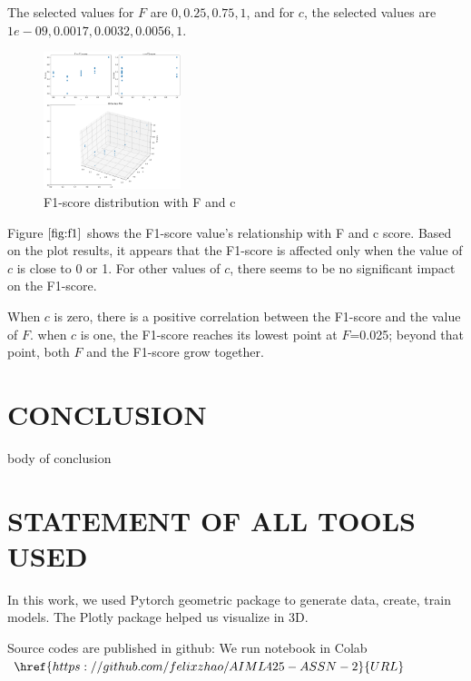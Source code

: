 \documentclass{article}
\begin{document}
  The selected values for $F$ are $0, 0.25, 0.75, 1$, and for $c$, the selected values are $1e-09, 0.0017, 0.0032, 0.0056, 1$.
  
  \begin{figure}[htb]

    \begin{minipage}[b]{1.0\linewidth}
      \centering
      \centerline{\includegraphics[width=4.0cm]{images/F_c_f1}}
    \end{minipage}
    \caption{F1-score distribution with F and c}
    \label{fig:f1}
    \end{figure}


Figure $\ref{fig:f1}$ shows the F1-score value's relationship with F and c score.
Based on the plot results, it appears that the F1-score is affected only when the value of $c$ is close to 0 or 1. For other values of $c$, there seems to be no significant impact on the F1-score.

When $c$ is zero, there is a positive correlation between the F1-score and the value of $F$.
when $c$ is one, the F1-score reaches its lowest point at 
$F$=0.025; beyond that point, both $F$ and the F1-score grow together.

\section{CONCLUSION}
\label{sec:conclusion}

body of conclusion

\section{STATEMENT OF ALL TOOLS USED}
\label{sec:statementofalltoolsused}

In this work, we used Pytorch geometric package to generate data, create, train models. 
The Plotly package helped us visualize in 3D. 

Source codes are published in github: 
We run notebook in Colab $\href{https://github.com/felixzhao/AIML425-ASSN-2}{URL}$
\end{document}
